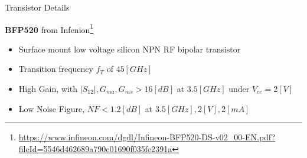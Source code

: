 \documentclass{beamer}
\begin{document}
\begin{frame}{Transistor Details}
\begin{center}
  \textbf{BFP520} from Infenion\footnote{\url{https://www.infineon.com/dgdl/Infineon-BFP520-DS-v02_00-EN.pdf?fileId=5546d462689a790c01690f035fe2391a}}
\end{center}
\begin{itemize}
  \item <2-> Surface mount low voltage silicon NPN RF bipolar transistor
  \item <3-> Transition frequency \(f_T\) of \(45[GHz]\)
  \item <4-> High Gain, with \(|S_{12}|, G_{ma}, G_{ms} > 16[dB]\) at \(3.5[GHz]\) under \(V_{ce} = 2[V]\)
  \item <5-> Low Noise Figure, \(NF < 1.2[dB]\) at \(3.5[GHz], 2[V], 2[mA]\)
\end{itemize}
\end{frame}
\end{document}
